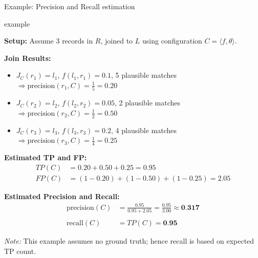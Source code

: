 \documentclass[8pt]{beamer} %
\begin{document}
	
\begin{frame}{Example: Precision and Recall estimation}
	
	\begin{beamercolorbox}[rounded=true, shadow=true, leftskip=1em, rightskip=1em]{example}		
	
		\textbf{Setup:} Assume 3 records in $R$, joined to $L$ using configuration $C = \langle f, \theta \rangle$.
		
		\vspace{0.5em}
		\textbf{Join Results:}
		\begin{itemize}
			\item $J_C(r_1) = l_1$, $f(l_1, r_1) = 0.1$, 5 plausible matches $\Rightarrow \text{precision}(r_1, C) = \frac{1}{5} = 0.20$
			\item $J_C(r_2) = l_2$, $f(l_2, r_2) = 0.05$, 2 plausible matches $\Rightarrow \text{precision}(r_2, C) = \frac{1}{2} = 0.50$
			\item $J_C(r_3) = l_3$, $f(l_3, r_3) = 0.2$, 4 plausible matches $\Rightarrow \text{precision}(r_3, C) = \frac{1}{4} = 0.25$
		\end{itemize}
		
		\vspace{0.5em}
		\textbf{Estimated TP and FP:}
		\begin{align*}
			TP(C) &= 0.20 + 0.50 + 0.25 = 0.95 \\
			FP(C) &= (1 - 0.20) + (1 - 0.50) + (1 - 0.25) = 2.05
		\end{align*}
	
		\vspace{0.5em}
		\textbf{Estimated Precision and Recall:}
		\begin{align*}
			\text{precision}(C) &= \frac{0.95}{0.95 + 2.05} = \frac{0.95}{3.00} \approx \textbf{0.317} \\\\
			\text{recall}(C) &= TP(C) = \textbf{0.95}
		\end{align*}
		
		\vspace{0.5em}
		\textit{Note:} This example assumes no ground truth; hence recall is based on expected TP count.
		
	\end{beamercolorbox}
	
\end{frame}
\end{document}
